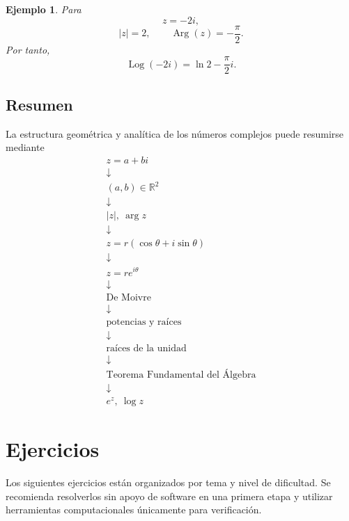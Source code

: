 \documentclass[12pt]{article}
\newtheorem{Ejem}{Ejemplo}
\begin{document}
\begin{Ejem}
Para
\[
z=-2i,
\]
\[
|z|=2, \qquad \operatorname{Arg}(z)=-\frac{\pi}{2}.
\]
Por tanto,
\[
\operatorname{Log}(-2i)= \ln2-\frac{\pi}{2}i.
\]
\end{Ejem}

\subsection*{Resumen}

La estructura geométrica y analítica de los números complejos puede resumirse
mediante
\[
\boxed{
\begin{array}{c}
z=a+bi
\\[0.2cm]
\downarrow
\\[0.2cm]
(a,b)\in\mathbb{R}^2
\\[0.2cm]
\downarrow
\\[0.2cm]
|z|,\ \arg z
\\[0.2cm]
\downarrow
\\[0.2cm]
z=r(\cos\theta+i\sin\theta)
\\[0.2cm]
\downarrow
\\[0.2cm]
z=re^{i\theta}
\\[0.2cm]
\downarrow
\\[0.2cm]
\text{De Moivre}
\\[0.2cm]
\downarrow
\\[0.2cm]
\text{potencias y raíces}
\\[0.2cm]
\downarrow
\\[0.2cm]
\text{raíces de la unidad}
\\[0.2cm]
\downarrow
\\[0.2cm]
\text{Teorema Fundamental del Álgebra}
\\[0.2cm]
\downarrow
\\[0.2cm]
e^z,\ \log z
\end{array}
}
\]

\section{Ejercicios}

Los siguientes ejercicios están organizados por tema y nivel de dificultad. Se recomienda resolverlos sin apoyo de software en una primera etapa y utilizar herramientas computacionales únicamente para verificación.
\end{document}
